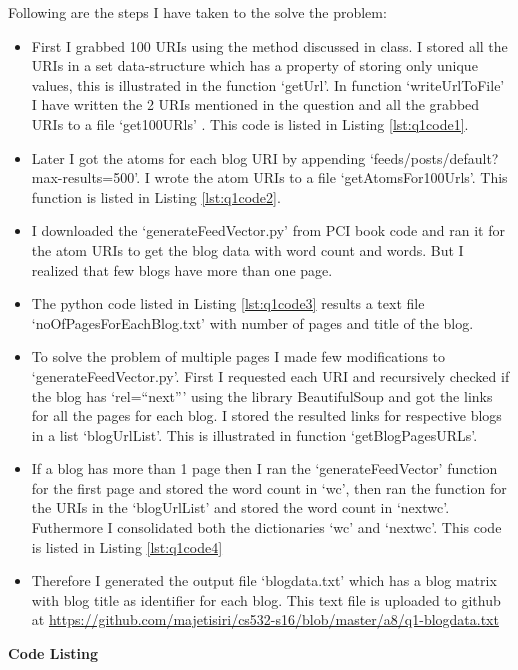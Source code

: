 Following are the steps I have taken to the solve the problem:
\begin{itemize}
\item First I grabbed 100 URIs using the method discussed in class. I stored all the URIs in a set data-structure which has a property of storing only unique values, this is illustrated in the function `getUrl'. In function `writeUrlToFile' I have written the 2 URIs mentioned in the question and all the grabbed URIs to a file `get100URls' . This code is listed in Listing \ref{lst:q1code1}.
\item Later I got the atoms for each blog URI by appending `feeds/posts/default?max-results=500'. I wrote the atom URIs to a file `getAtomsFor100Urls'. This function is listed in Listing \ref{lst:q1code2}.
\item I downloaded the `generateFeedVector.py' from PCI book code and ran it for the atom URIs to get the blog data with word count and words. But I realized that few blogs have more than one page.
\item The python code listed in Listing \ref{lst:q1code3} results a text file `noOfPagesForEachBlog.txt' with number of pages and title of the blog. 
\item To solve the problem of multiple pages I  made few modifications to `generateFeedVector.py'. First I requested each URI and recursively checked if the blog has `rel=``next''' using the library BeautifulSoup and got the links for all the pages for each blog.  I stored the resulted links for respective blogs in a list `blogUrlList'. This is illustrated in function `getBlogPagesURLs'.
\item If a blog has more than 1 page then I ran the `generateFeedVector' function for the first page and stored the word count in `wc', then ran the function for the URIs in the `blogUrlList' and stored the word count in `nextwc'. Futhermore I consolidated both the dictionaries `wc' and `nextwc'. This code is listed in Listing \ref{lst:q1code4}
\item Therefore I generated the output file `blogdata.txt' which has a blog matrix with blog title as identifier for each blog. This text file is uploaded to github at \url{https://github.com/majetisiri/cs532-s16/blob/master/a8/q1-blogdata.txt}
\end{itemize}

\newpage
\textbf{Code Listing}
\sloppy


